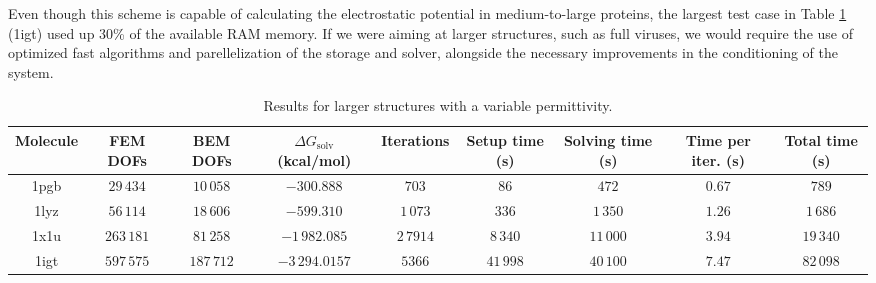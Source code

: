 Even though this scheme is capable of calculating the electrostatic potential in medium-to-large proteins, the largest test case in Table \ref{table:large_variable} (1igt) used up 30\% of the available RAM memory. 
If we were aiming at larger structures, such as full viruses,\cite{MartinezETal2019,wang2021high} we would require the use of optimized fast algorithms\cite{wang2021exafmm,kailasa2023pyexafmm} and
parellelization of the storage and solver, alongside the necessary improvements in the conditioning of the system.

\begin{table}
\centering
\footnotesize
\begin{tabular}{c|c|c|c|c|c|c|c|c}
Molecule & \parbox{1.1cm}{\centering FEM DOFs}  & \parbox{1.1cm}{\centering BEM DOFs} &  \parbox{1.8cm}{\centering $\Delta G_{\text{solv}}$ (kcal/mol)}& Iterations & \parbox{1.3cm}{\centering Setup time (s)} & \parbox{1.3cm}{\centering Solving time (s)} & \parbox{1.5cm}{\centering Time per iter. (s)} & \parbox{1.4cm}{\centering Total time (s)} \\[3mm]
\hline
  1pgb  & $29\,434$ &  $10\,058$ &  $-300.888$ & $703$ & $86$ & $472$ & $0.67$ & $789$  \\
 1lyz  & $56\,114$ & $18\,606$ &  $-599.310$ & $1\,073$ & $336$ & $1\,350$  & $1.26$ & $1\,686$   \\
 1x1u & $263\,181$ & $81\,258$ & $-1\,982.085$ & $2\,7914$ & $8\,340$ & $11\,000$ & $3.94$ & $19\,340$  \\
 1igt & $597\,575$ & $187\,712$ &  $-3\,294.0157$ & $5 366$ & $41\,998$ & $40\,100$ &  $7.47$ & $82\,098$    \\
\end{tabular}
\caption{Results for larger structures with a variable permittivity.}
\label{table:large_variable}
\end{table}
